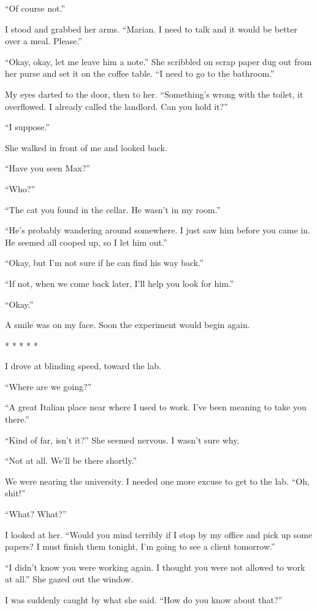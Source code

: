 \documentclass[
]{article}
\begin{document}
``Of course not.''

I stood and grabbed her arms. ``Marian. I need to talk and it would be
better over a meal. Please.''

``Okay, okay, let me leave him a note.'' She scribbled on scrap paper
dug out from her purse and set it on the coffee table. ``I need to go to
the bathroom.''

My eyes darted to the door, then to her. ``Something's wrong with the
toilet, it overflowed. I already called the landlord. Can you hold it?''

``I suppose.''

She walked in front of me and looked back.

``Have you seen Max?''

``Who?''

``The cat you found in the cellar. He wasn't in my room.''

``He's probably wandering around somewhere. I just saw him before you
came in. He seemed all cooped up, so I let him out.''

``Okay, but I'm not sure if he can find his way back.''

``If not, when we come back later, I'll help you look for him.''

``Okay.''

A smile was on my face. Soon the experiment would begin again.

* * * * *

I drove at blinding speed, toward the lab.

``Where are we going?''

``A great Italian place near where I used to work. I've been meaning to
take you there.''

``Kind of far, isn't it?'' She seemed nervous. I wasn't sure why.

``Not at all. We'll be there shortly.''

We were nearing the university. I needed one more excuse to get to the
lab. ``Oh, shit!''

``What? What?''

I looked at her. ``Would you mind terribly if I stop by my office and
pick up some papers? I must finish them tonight, I'm going to see a
client tomorrow.''

``I didn't know you were working again. I thought you were not allowed
to work at all.'' She gazed out the window.

I was suddenly caught by what she said. ``How do you know about that?''
\end{document}
